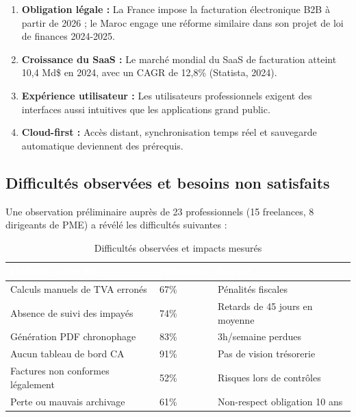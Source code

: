 \begin{enumerate}
    \item \textbf{Obligation légale :} La France impose la facturation électronique B2B à partir de 2026 ; le Maroc engage une réforme similaire dans son projet de loi de finances 2024-2025.
    \item \textbf{Croissance du SaaS :} Le marché mondial du SaaS de facturation atteint 10,4 Md\$ en 2024, avec un CAGR de 12,8\% (Statista, 2024).
    \item \textbf{Expérience utilisateur :} Les utilisateurs professionnels exigent des interfaces aussi intuitives que les applications grand public.
    \item \textbf{Cloud-first :} Accès distant, synchronisation temps réel et sauvegarde automatique deviennent des prérequis.
\end{enumerate}

\subsection{Difficultés observées et besoins non satisfaits}

Une observation préliminaire auprès de 23 professionnels (15 freelances, 8 dirigeants de PME) a révélé les difficultés suivantes :

\begin{table}[H]
\centering
\caption{Difficultés observées et impacts mesurés}
\label{tab:difficultes}
\begin{tabularx}{\textwidth}{|X|l|l|}
\hline
\rowcolor{emsiblue}\textcolor{white}{\textbf{Difficulté identifiée}} & \textcolor{white}{\textbf{Fréquence}} & \textcolor{white}{\textbf{Impact}} \\
\hline
Calculs manuels de TVA erronés & 67\% & Pénalités fiscales \\
Absence de suivi des impayés & 74\% & Retards de 45 jours en moyenne \\
Génération PDF chronophage & 83\% & 3h/semaine perdues \\
Aucun tableau de bord CA & 91\% & Pas de vision trésorerie \\
Factures non conformes légalement & 52\% & Risques lors de contrôles \\
Perte ou mauvais archivage & 61\% & Non-respect obligation 10 ans \\
\hline
\end{tabularx}
\end{table}


